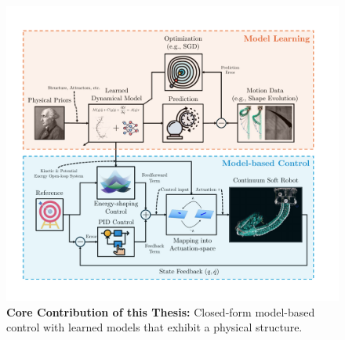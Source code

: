 \begin{figure}[ht]
    \centering
    \includegraphics[width=0.9\linewidth]{introduction/figures/model_based_control_with_learned_models_v2_cropped.pdf}
    \caption{\textbf{Core Contribution of this Thesis:} Closed-form model-based control with learned models that exhibit a physical structure.}
    \label{fig:introduction:model_based_control_with_learned_models}
\end{figure}


